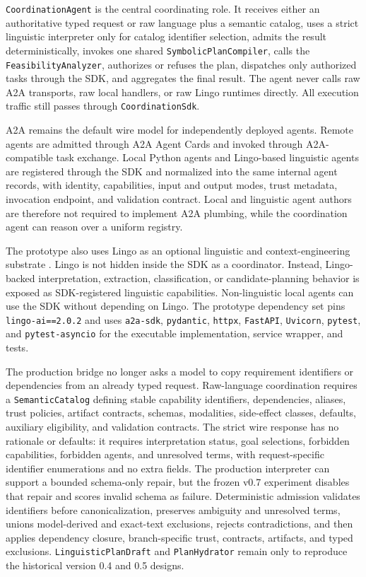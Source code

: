 \texttt{CoordinationAgent} is the central coordinating role. It receives either an authoritative typed request or raw language plus a semantic catalog, uses a strict linguistic interpreter only for catalog identifier selection, admits the result deterministically, invokes one shared \texttt{SymbolicPlanCompiler}, calls the \texttt{FeasibilityAnalyzer}, authorizes or refuses the plan, dispatches only authorized tasks through the SDK, and aggregates the final result. The agent never calls raw A2A transports, raw local handlers, or raw Lingo runtimes directly. All execution traffic still passes through \texttt{CoordinationSdk}.

A2A remains the default wire model for independently deployed agents. Remote agents are admitted through A2A Agent Cards and invoked through A2A-compatible task exchange. Local Python agents and Lingo-based linguistic agents are registered through the SDK and normalized into the same internal agent records, with identity, capabilities, input and output modes, trust metadata, invocation endpoint, and validation contract. Local and linguistic agent authors are therefore not required to implement A2A plumbing, while the coordination agent can reason over a uniform registry.

The prototype also uses Lingo as an optional linguistic and context-engineering substrate \cite{lingo2026}. Lingo is not hidden inside the SDK as a coordinator. Instead, Lingo-backed interpretation, extraction, classification, or candidate-planning behavior is exposed as SDK-registered linguistic capabilities. Non-linguistic local agents can use the SDK without depending on Lingo. The prototype dependency set pins \texttt{lingo-ai==2.0.2} and uses \texttt{a2a-sdk}, \texttt{pydantic}, \texttt{httpx}, \texttt{FastAPI}, \texttt{Uvicorn}, \texttt{pytest}, and \texttt{pytest-asyncio} for the executable implementation, service wrapper, and tests.

The production bridge no longer asks a model to copy requirement identifiers or dependencies from an already typed request. Raw-language coordination requires a \texttt{SemanticCatalog} defining stable capability identifiers, dependencies, aliases, trust policies, artifact contracts, schemas, modalities, side-effect classes, defaults, auxiliary eligibility, and validation contracts. The strict wire response has no rationale or defaults: it requires interpretation status, goal selections, forbidden capabilities, forbidden agents, and unresolved terms, with request-specific identifier enumerations and no extra fields. The production interpreter can support a bounded schema-only repair, but the frozen v0.7 experiment disables that repair and scores invalid schema as failure. Deterministic admission validates identifiers before canonicalization, preserves ambiguity and unresolved terms, unions model-derived and exact-text exclusions, rejects contradictions, and then applies dependency closure, branch-specific trust, contracts, artifacts, and typed exclusions. \texttt{LinguisticPlanDraft} and \texttt{PlanHydrator} remain only to reproduce the historical version 0.4 and 0.5 designs.

